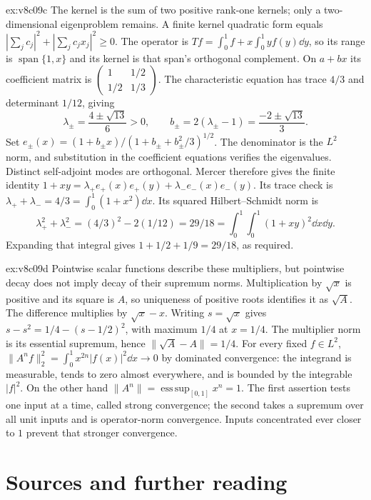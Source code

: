 \begin{solution}{ex:v8c09c}
\idea The kernel is the sum of two positive rank-one kernels; only a two-dimensional eigenproblem remains.
\writeup A finite kernel quadratic form equals $|\sum_jc_j|^2+|\sum_jc_jx_j|^2\ge0$. The operator is
$Tf=\int_0^1f+x\int_0^1yf(y)\dd y$,
so its range is $\operatorname{span}\{1,x\}$ and its kernel is that span's orthogonal complement. On $a+bx$ its coefficient matrix is $\begin{pmatrix}1&1/2\\1/2&1/3\end{pmatrix}$. The characteristic equation has trace $4/3$ and determinant $1/12$, giving
\[
\lambda_\pm=\frac{4\pm\sqrt{13}}6>0,\qquad
b_\pm=2(\lambda_\pm-1)=\frac{-2\pm\sqrt{13}}3.
\]
Set $e_\pm(x)=(1+b_\pm x)/(1+b_\pm+b_\pm^2/3)^{1/2}$. The denominator is the $L^2$ norm, and substitution in the coefficient equations verifies the eigenvalues. Distinct self-adjoint modes are orthogonal. Mercer therefore gives the finite identity
$1+xy=\lambda_+e_+(x)e_+(y)+\lambda_-e_-(x)e_-(y)$.
Its trace check is $\lambda_++\lambda_-=4/3=\int_0^1(1+x^2)\dd x$. Its squared Hilbert--Schmidt norm is
\[
\lambda_+^2+\lambda_-^2=(4/3)^2-2(1/12)=29/18
=\int_0^1\int_0^1(1+xy)^2\dd x\dd y.
\]
Expanding that integral gives $1+1/2+1/9=29/18$, as required.
\end{solution}

\begin{solution}{ex:v8c09d}
\idea Pointwise scalar functions describe these multipliers, but pointwise decay does not imply decay of their supremum norms.
\writeup Multiplication by $\sqrt x$ is positive and its square is $A$, so uniqueness of positive roots identifies it as $\sqrt A$. The difference multiplies by $\sqrt x-x$. Writing $s=\sqrt x$ gives $s-s^2=1/4-(s-1/2)^2$, with maximum $1/4$ at $x=1/4$. The multiplier norm is its essential supremum, hence $\|\sqrt A-A\|=1/4$.
For every fixed $f\in L^2$, $\|A^nf\|_2^2=\int_0^1x^{2n}|f(x)|^2\dd x\to0$ by dominated convergence: the integrand is measurable, tends to zero almost everywhere, and is bounded by the integrable $|f|^2$. On the other hand $\|A^n\|=\operatorname*{ess\,sup}_{[0,1]}x^n=1$. The first assertion tests one input at a time, called strong convergence; the second takes a supremum over all unit inputs and is operator-norm convergence. Inputs concentrated ever closer to $1$ prevent that stronger convergence.
\end{solution}

\section*{Sources and further reading}

